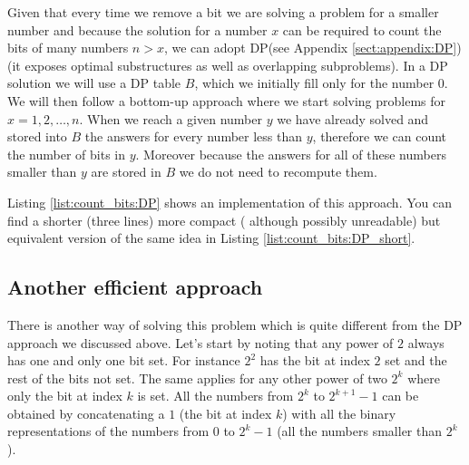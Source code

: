 Given that every time we remove a bit we are solving a problem for a smaller number and because the
solution for a number $x$ can be required to count the bits of many numbers $n>x$, we can adopt
DP(see Appendix \ref{sect:appendix:DP}) (it exposes optimal substructures as well as overlapping subproblems). In a
DP solution we will use  a DP table $B$, which we initially fill only for the number $0$. We will
then follow a bottom-up approach where we start solving problems for $x=1,2,\ldots,n$. When we
reach a given number $y$ we have already solved and stored into $B$ the answers for every number less
than $y$, therefore we can count the number of bits in $y$.
Moreover because the answers for all of
these numbers smaller than $y$ are stored in $B$ we do not need to recompute them. 

Listing \ref{list:count_bits:DP} shows an implementation of this approach. You can find a shorter (three
lines) more compact ( although possibly unreadable) but equivalent version of the same idea in
Listing \ref{list:count_bits:DP_short}.





\subsection{Another efficient approach}
\label{count_bits:sec:pattern}
There is another way of solving this problem which is quite different from the DP approach we
discussed above. Let's start by noting that any power of $2$ always has one and only one bit set.
For instance $2^2$ has the bit at index $2$ set and the rest of the bits not set. The same applies
for any other power of two $2^k$ where only the bit at index $k$ is set. All the numbers from $2^k$
to $2^{k+1}-1$ can be obtained by concatenating a $1$ (the bit at index $k$) with all the binary
representations of the numbers from $0$ to $2^k-1$ (all the numbers smaller than $2^k$).

